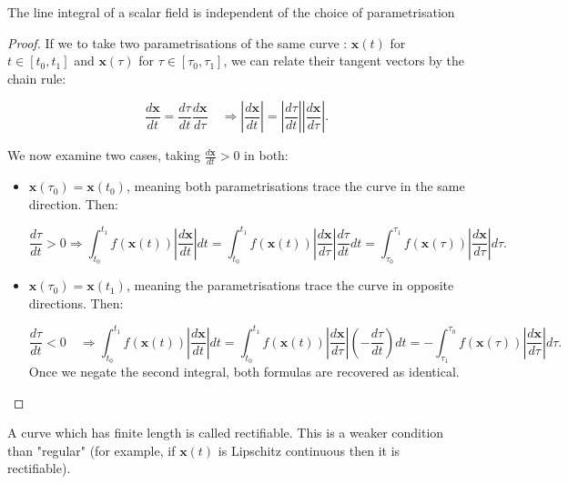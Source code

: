 \begin{proposition}
  The line integral of a scalar field is independent of the choice of parametrisation
\end{proposition}

\begin{proof}
  If we to take two parametrisations of the same curve : \(\mathbf{x}(t) \) for \(t \in [t_0,t_1]\) and \(\mathbf{x}(\tau) \) for \(\tau \in [\tau_0,\tau_1]\), we can relate their tangent vectors by the chain rule:

  \[
\frac{d \boldsymbol{x}}{d t}=\frac{d \tau}{d t} \frac{d \boldsymbol{x}}{d \tau} \quad \Longrightarrow\left|\frac{d \boldsymbol{x}}{d t}\right|=\left|\frac{d \tau}{d t}\right|\left|\frac{d \boldsymbol{x}}{d \tau}\right| .
\]

We now examine two cases, taking \(\frac{d \mathbf{x}}{dt}>0\) in both:

\begin{itemize}
  \item[Case 1: ] \(\mathbf{x}(\tau_0) = \mathbf{x}(t_0)\), meaning both parametrisations trace the curve in the same direction. Then:

    \[
\frac{d \tau}{d t}>0 \Longrightarrow \int_{t_0}^{t_1} f(\boldsymbol{x}(t))\left|\frac{d \boldsymbol{x}}{d t}\right| d t=\int_{t_0}^{t_1} f(\boldsymbol{x}(t))\left|\frac{d \boldsymbol{x}}{d \tau}\right| \frac{d \tau}{d t} d t=\int_{\tau_0}^{\tau_1} f(\boldsymbol{x}(\tau))\left|\frac{d \boldsymbol{x}}{d \tau}\right| d \tau .
\]
  \item[Case 2: ] \(\mathbf{x}(\tau_0) = \mathbf{x}(t_1)\), meaning the parametrisations trace the curve in opposite directions. Then:

\[
\frac{d \tau}{d t}<0 \quad \Longrightarrow \int_{t_0}^{t_1} f(\boldsymbol{x}(t))\left|\frac{d \boldsymbol{x}}{d t}\right| d t=\int_{t_0}^{t_1} f(\boldsymbol{x}(t))\left|\frac{d \boldsymbol{x}}{d \tau}\right|\left(-\frac{d \tau}{d t}\right) d t=-\int_{\tau_1}^{\tau_0} f(\boldsymbol{x}(\tau))\left|\frac{d \boldsymbol{x}}{d \tau}\right| d \tau .
\]
Once we negate the second integral, both formulas are recovered as identical.



\end{itemize}

\end{proof}

\begin{definition}[Rectifiable]
  
A curve which has finite length is called rectifiable. This is a weaker condition than "regular" (for example, if $\boldsymbol{x}(t)$ is Lipschitz continuous then it is rectifiable).

\end{definition}


